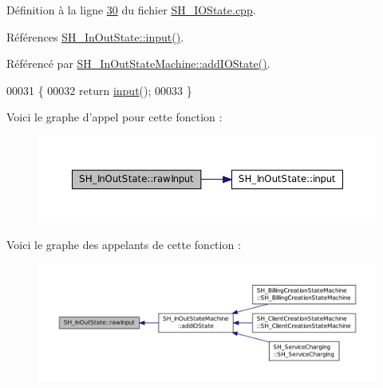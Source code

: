 Définition à la ligne \hyperlink{SH__IOState_8cpp_source_l00030}{30} du fichier \hyperlink{SH__IOState_8cpp_source}{S\-H\-\_\-\-I\-O\-State.\-cpp}.



Références \hyperlink{classSH__InOutState_a8e1b78069343122df7713624a1a5a100}{S\-H\-\_\-\-In\-Out\-State\-::input()}.



Référencé par \hyperlink{classSH__InOutStateMachine_a2528cffddbe6f98c32ebef41423c0118}{S\-H\-\_\-\-In\-Out\-State\-Machine\-::add\-I\-O\-State()}.


\begin{DoxyCode}
00031 \{
00032     \textcolor{keywordflow}{return} \hyperlink{classSH__InOutState_a8e1b78069343122df7713624a1a5a100}{input}();
00033 \}
\end{DoxyCode}


Voici le graphe d'appel pour cette fonction \-:\nopagebreak
\begin{figure}[H]
\begin{center}
\leavevmode
\includegraphics[width=350pt]{classSH__InOutState_a4c674a54f41d2e6ef951b22393dcd89f_cgraph}
\end{center}
\end{figure}




Voici le graphe des appelants de cette fonction \-:\nopagebreak
\begin{figure}[H]
\begin{center}
\leavevmode
\includegraphics[width=350pt]{classSH__InOutState_a4c674a54f41d2e6ef951b22393dcd89f_icgraph}
\end{center}
\end{figure}


